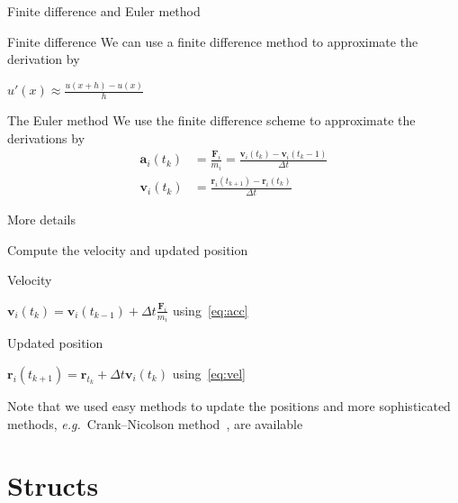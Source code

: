 \documentclass[12pt,t]{beamer}
\begin{document}
\begin{frame}{Finite difference and Euler method}

\begin{block}{Finite difference}
We can use a finite difference method to approximate the derivation by
\begin{center}
$u'(x) \approx \frac{u(x+h)-u(x)}{h}$
\end{center}
\end{block}

\begin{block}{The Euler method}
We use the finite difference scheme to approximate the derivations by
\begin{align}
\mathbf{a}_i(t_k) &= \frac{\mathbf{F}_i}{m_i} = \frac{\mathbf{v}_i(t_k)-\mathbf{v}_i(t_k-1)}{\Delta t} \label{eq:acc} \\
\mathbf{v}_i(t_k) &= \frac{\mathbf{r}_i(t_{k+1})-\mathbf{r}_i(t_k)}{\Delta t}\label{eq:vel}
\end{align}
\end{block}
\vspace*{-0.4cm}
More details~\cite{strikwerda2004finite,leveque2007finite,euler1824institutionum}

\end{frame}

\begin{frame}{Compute the velocity and updated position}

\begin{block}{Velocity}
\begin{center}
$ \mathbf{v}_i(t_k) = \mathbf{v}_i(t_{k-1}) + \Delta t \frac{\mathbf{F}_i}{m_i} $ using~\eqref{eq:acc}
\end{center}
\end{block}

\begin{block}{Updated position}
\begin{center}
$\mathbf{r}_i(t_{k+1}) = \mathbf{r}_{t_k} + \Delta t \mathbf{v}_i(t_k)$ using~\eqref{eq:vel}
\end{center}
\end{block}
Note that we used easy methods to update the positions and more sophisticated methods, \emph{e.g.}\ Crank--Nicolson method~\cite{crank1947practical}, are available
\end{frame}



\section{Structs}
\end{document}

